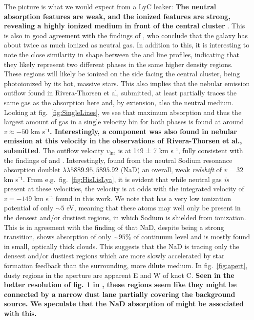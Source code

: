 \documentclass[twocolumn, trackchanges]{aastex61}
\begin{document}
The picture is what we would expect from a LyC leaker: \textbf{The
neutral absorption features are weak, and the ionized features are
strong, revealing a   highly ionized medium
in front of the central cluster} . This is also in good agreement with the
findings of \citet{Pardy2016arXiv}, who conclude that the galaxy has
about twice as much ionized as neutral gas. In addition to this, it is
interesting to note the close similarity in shape between the
 and  line profiles, indicating that they likely
represent two different phases in the same higher density regions. These
regions will likely be ionized on the side facing the central cluster,
being photoionized by its hot, massive stars. This also implies that the
nebular emission outflow found in Rivera-Thorsen et al, submitted,
at least partially traces the same gas as the  absorption
here and, by extension, also the neutral medium. Looking at
fig.~\ref{fig:SingleLines}, we see that maximum absorption and thus the
largest amount of gas in a single velocity bin for both phases is found
at around $v \approx -50$ km s⁻¹\textbf{. Interestingly, a component was also
found in nebular emission at this velocity in the observations of 
Rivera-Thorsen et al., submitted}. The outflow velocity
$v_{\text{int}}$ is at 149 ± 7 km s⁻¹, fully consistent with the
findings of \citet{Heckman2015} and \citet{Alexandroff2015}.
Interestingly, \citet{Sandberg2013} found from the neutral Sodium
resonance absorption doublet $\lambda \lambda 5889.95,5895.92$ (NaD) an
overall, weak \emph{redshift} of $v = 32$ km s⁻¹. From
e.g.~fig.~\ref{fig:HisLisLya}, it is evident that while neutral gas
\emph{is} present at these velocities, the velocity is at odds with the
integrated velocity of $v = -149$ km s⁻¹ found in this work. We note
that  has a very low ionization potential of only $\sim 5$
eV, meaning that these atoms may well only be present in the densest
and/or dustiest regions, in which Sodium is shielded from ionization.
This is in agreement with the finding of \citet{Sandberg2013} that NaD,
despite being a strong transition, shows absorption of only $\sim 95\%$
of continuum level and is mostly found in small, optically thick clouds.
This suggests that the NaD is tracing only the densest and/or dustiest
regions which are more slowly accelerated by star formation feedback
than the surrounding, more dilute medium. In fig.~\ref{fig:apert}, dusty
regions in the aperture are apparent E and W of knot C. \textbf{Seen in the
better resolution of fig. 1 in \citet{Adamo2010}, these regions seem
like they might be connected by a narrow dust lane partially covering
the background source. We speculate that the NaD absorption of
\citet{Sandberg2013} might be associated with this.}
\end{document}
